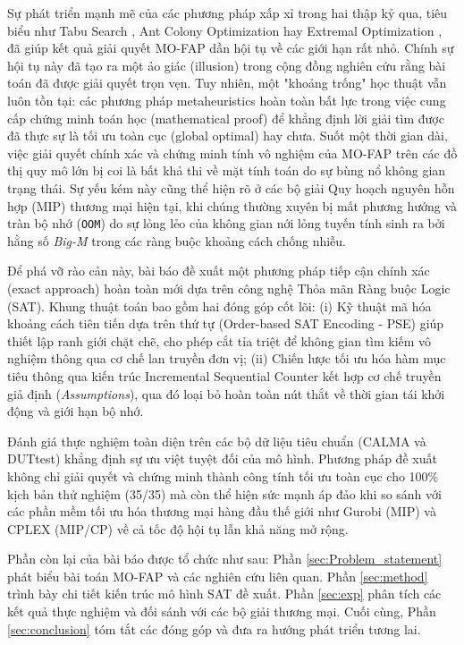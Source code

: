 Sự phát triển mạnh mẽ của các phương pháp xấp xỉ trong hai thập kỷ qua, tiêu biểu như Tabu Search \cite{Alrajhi2016_Hybridized}, Ant Colony Optimization \cite{Alrajhi2023DynamicACO} hay Extremal Optimization \cite{Gomez2023MO}, đã giúp kết quả giải quyết MO-FAP dần hội tụ về các giới hạn rất nhỏ. Chính sự hội tụ này đã tạo ra một ảo giác (illusion) trong cộng đồng nghiên cứu rằng bài toán đã được giải quyết trọn vẹn. Tuy nhiên, một "khoảng trống" học thuật vẫn luôn tồn tại: các phương pháp metaheuristics hoàn toàn bất lực trong việc cung cấp chứng minh toán học (mathematical proof) để khẳng định lời giải tìm được đã thực sự là tối ưu toàn cục (global optimal) hay chưa. Suốt một thời gian dài, việc giải quyết chính xác và chứng minh tính vô nghiệm của MO-FAP trên các đồ thị quy mô lớn bị coi là bất khả thi về mặt tính toán do sự bùng nổ không gian trạng thái. Sự yếu kém này cũng thể hiện rõ ở các bộ giải Quy hoạch nguyên hỗn hợp (MIP) thương mại hiện tại, khi chúng thường xuyên bị mất phương hướng và tràn bộ nhớ (\texttt{OOM}) do sự lỏng lẻo của không gian nới lỏng tuyến tính sinh ra bởi hằng số \textit{Big-M} trong các ràng buộc khoảng cách chống nhiễu.

Để phá vỡ rào cản này, bài báo đề xuất một phương pháp tiếp cận chính xác (exact approach) hoàn toàn mới dựa trên công nghệ Thỏa mãn Ràng buộc Logic (SAT). Khung thuật toán bao gồm hai đóng góp cốt lõi: 
(i) Kỹ thuật mã hóa khoảng cách tiên tiến dựa trên thứ tự (Order-based SAT Encoding - PSE) giúp thiết lập ranh giới chặt chẽ, cho phép cắt tỉa triệt để không gian tìm kiếm vô nghiệm thông qua cơ chế lan truyền đơn vị; 
(ii) Chiến lược tối ưu hóa hàm mục tiêu thông qua kiến trúc Incremental Sequential Counter kết hợp cơ chế truyền giả định (\textit{Assumptions}), qua đó loại bỏ hoàn toàn nút thắt về thời gian tái khởi động và giới hạn bộ nhớ.

Đánh giá thực nghiệm toàn diện trên các bộ dữ liệu tiêu chuẩn (CALMA và DUTtest) khẳng định sự ưu việt tuyệt đối của mô hình. Phương pháp đề xuất không chỉ giải quyết và chứng minh thành công tính tối ưu toàn cục cho 100\% kịch bản thử nghiệm (35/35) mà còn thể hiện sức mạnh áp đảo khi so sánh với các phần mềm tối ưu hóa thương mại hàng đầu thế giới như Gurobi (MIP) và CPLEX (MIP/CP) về cả tốc độ hội tụ lẫn khả năng mở rộng.

Phần còn lại của bài báo được tổ chức như sau: Phần \ref{sec:Problem_statement} phát biểu bài toán MO-FAP và các nghiên cứu liên quan. Phần \ref{sec:method} trình bày chi tiết kiến trúc mô hình SAT đề xuất. Phần \ref{sec:exp} phân tích các kết quả thực nghiệm và đối sánh với các bộ giải thương mại. Cuối cùng, Phần \ref{sec:conclusion} tóm tắt các đóng góp và đưa ra hướng phát triển tương lai.



